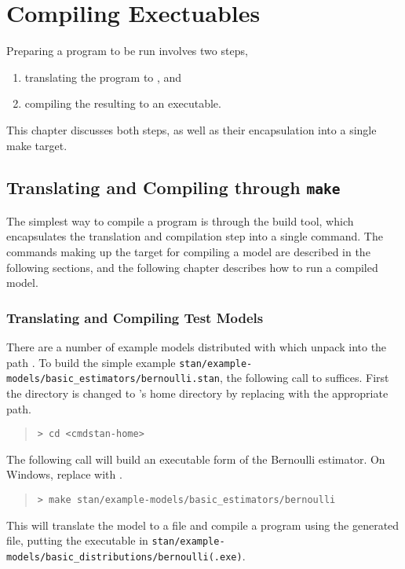 \chapter{Compiling \CmdStan Exectuables}\label{compiling.chapter}

\noindent
Preparing a \Stan program to be run involves two steps,
%
\begin{enumerate}
\item translating the \Stan program to \Cpp, and
\item compiling the resulting \Cpp to an executable.
\end{enumerate}
%
This chapter discusses both steps, as well as their encapsulation into
a single make target.  

\section{Translating and Compiling through {\tt\bfseries make}}\label{make-models.section}

The simplest way to compile a \CmdStan program is through the 
build tool, which encapsulates the translation and compilation step
into a single command.  The commands making up the  target
for compiling a model are described in the following sections, and the
following chapter describes how to run a compiled model.

\subsection{Translating and Compiling Test Models}

There are a number of example models distributed with \CmdStan which
unpack into the path .  To build the simple
example
\nolinkurl{stan/example-models/basic\_estimators/bernoulli.stan}, the
following call to  suffices.  First the directory is
changed to \CmdStan's home directory by replacing
 with the appropriate path.
%
\begin{quote}
\begin{Verbatim}[fontshape=sl]
> cd <cmdstan-home>
\end{Verbatim}
\end{quote}
%
The following call will build an executable form of the Bernoulli
estimator. On Windows, replace  with .
%
\begin{quote}
\begin{Verbatim}[fontshape=sl]
> make stan/example-models/basic_estimators/bernoulli
\end{Verbatim}
\end{quote}
%
This will translate the model  to a \Cpp file and
compile a \CmdStan program using the generated \Cpp file, putting the
executable in
\nolinkurl{stan/example-models/basic_distributions/bernoulli(.exe)}.

